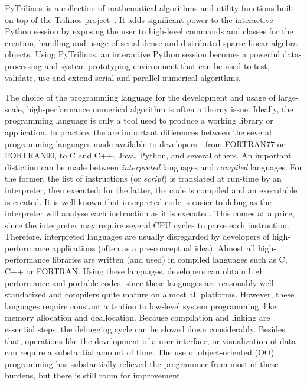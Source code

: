 \documentclass[10pt,relax]{SANDreport}
\newcommand{\PyTrilinos}{{PyTrilinos}}
\begin{document}
\PyTrilinos\ is a collection of mathematical algorithms and utility functions
built on top of the Trilinos
project~\cite{Heroux:2005:OTP,Trilinos-home-page}.  It adds significant power
to the interactive Python session by exposing the user to high-level commands
and classes for the creation, handling and usage of serial dense and
distributed sparse linear algebra objects. Using \PyTrilinos, an interactive
Python session becomes a powerful data-processing and system-prototyping
environment that can be used to test, validate, use
and extend serial and parallel numerical algorithms.

\smallskip

The choice of the programming language for the development and usage of
large-scale, high-performance numerical algorithm is often a thorny issue.
Ideally, the programming language is only a tool used to produce a working
library or application. In practice, the are important differences between the
several programming languages made available to developers---from FORTRAN77 or
FORTRAN90, to C and C++, Java, Python, and several others. An important
distiction can be made between {\sl interpreted} languages and {\sl compiled}
languages. For the former, the list of instructions (or {\sl script}) is
translated at run-time by an interpreter, then executed; for the latter, the
code is compiled and an executable is created. It is well known that
interpreted code is easier to debug as the interpreter will analyse each
instruction as it is executed. This comes at a price, since the interpreter
may require several CPU cycles to parse each instruction. Therefore,
interpreted languages are usually disregarded by developers of
high-performance applications (often as a pre-conceptual idea). Almost all
high-performance libraries are written (and used) in compiled languages
such as C, C++ or FORTRAN. Using these languages, developers can obtain 
high performance and portable codes,
since these languages are reasonably well standarized and compilers quite
mature on almost all platforms.  However,
these languages require constant attention to low-level system
programming, like memory allocation and deallocation.  Because
compilation and linking are essential steps, the debugging cycle can
be slowed down considerably.  Besides that, operations like the
development of a user interface, or visualization of data can require
a substantial amount of time. The use of object-oriented (OO)
programming has substantially relieved the programmer from most of
these burdens, but there is still room for improvement.
\end{document}

